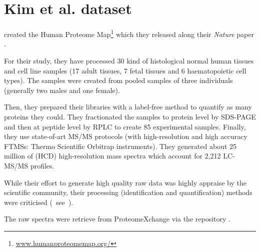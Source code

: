 \chapter{Kim et al. dataset}
\label{ch:pandeyData}



\cite{PandeyData} created the Human Proteome Map\footnote{%
\href{http://www.humanproteomemap.org/}{\small www.humanproteomemap.org/}} which
they released along their \emph{Nature} paper .

For their study, they have processed 30 kind of histological normal human
tissues and cell line samples (17 adult tissues, 7 fetal tissues and 6
haematopoietic cell types). The samples were created from pooled samples of three
individuals (generally two males and one female).

Then, they prepared their libraries with a label-free method to quantify
as many proteins they could. They fractionated the samples to protein level by
\gls{SDS-PAGE} and then at peptide level by \gls{RPLC} to create 85 experimental
samples. Finally, they use state-of-art \gls{MS/MS} protocols
(with high-resolution and high accuracy \glspl{FTMS}:
Thermo Scientific Orbitrap instruments).
They generated about 25 million of (\gls{HCD})
high-resolution mass spectra which account for 2,212 \gls{LC-MS/MS} profiles.

While their effort to generate high quality raw data was highly appraise
by the scientific community, their processing
(identification and quantification) methods were
criticised (\eg\ see~\cite{Ezkurdia2014-qx}).

The raw spectra were retrieve from ProteomeXchange via the repository
.
